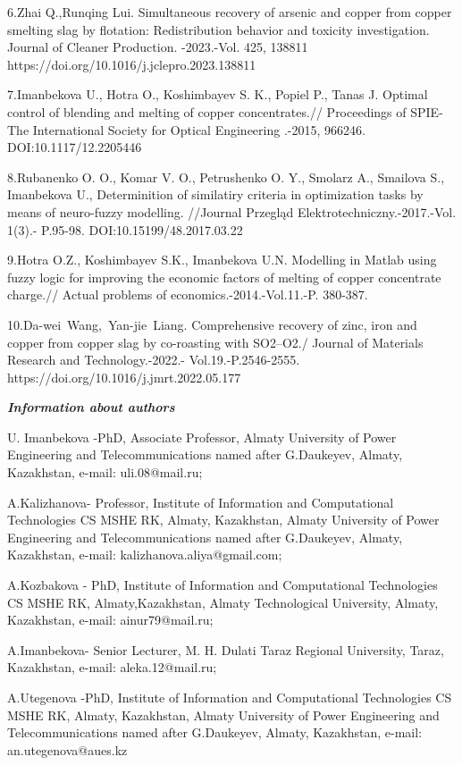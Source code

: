 6.Zhai Q.,Runqing Lui. Simultaneous recovery of arsenic and copper from
copper smelting slag by flotation: Redistribution behavior and toxicity
investigation. Journal of Cleaner Production. -2023.-Vol. 425, 138811
https://doi.org/10.1016/j.jclepro.2023.138811

7.Imanbekova U., Hotra O., Koshimbayev S. K., Popiel P., Tanas J.
Optimal control of blending and melting of copper concentrates.//
Proceedings of SPIE-The International Society for Optical Engineering
.-2015, 966246. DOI:10.1117/12.2205446

8.Rubanenko O. O., Komar V. O., Petrushenko O. Y., Smolarz A., Smailova
S., Imanbekova U., Determinition of similatiry criteria in optimization
tasks by means of neuro-fuzzy modelling. //Journal Przegląd
Elektrotechniczny.-2017.-Vol. 1(3).- P.95-98. DOI:10.15199/48.2017.03.22

9.Hotra O.Z., Koshimbayev S.K., Imanbekova U.N. Modelling in Matlab
using fuzzy logic for improving the economic factors of melting of
copper concentrate charge.// Actual problems of
economics.-2014.-Vol.11.-P. 380-387.

10.Da-wei~Wang,~Yan-jie~Liang. Comprehensive recovery of zinc, iron and
copper from copper slag by co-roasting with SO2--O2./ Journal of
Materials Research and Technology.-2022.- Vol.19.-P.2546-2555.
https://doi.org/10.1016/j.jmrt.2022.05.177

\emph{{\bfseries Information about authors}}

U. Imanbekova -PhD, Associate Professor, Almaty University of Power
Engineering and Telecommunications named after G.Daukeyev, Almaty,
Kazakhstan, e-mail: uli.08@mail.ru;

A.Kalizhanova- Professor, Institute of Information and Computational
Technologies CS MSHE RK, Almaty, Kazakhstan, Almaty University of Power
Engineering and Telecommunications named after G.Daukeyev, Almaty,
Kazakhstan, e-mail: kalizhanova.aliya@gmail.com;

A.Kozbakova - PhD, Institute of Information and Computational
Technologies CS MSHE RK, Almaty,Kazakhstan, Almaty Technological
University, Almaty, Kazakhstan, e-mail: ainur79@mail.ru;

A.Imanbekova- Senior Lecturer, M. H. Dulati Taraz Regional University,
Taraz, Kazakhstan, e-mail: aleka.12@mail.ru;

A.Utegenova -PhD, Institute of Information and Computational
Technologies CS MSHE RK, Almaty, Kazakhstan, Almaty University of Power
Engineering and Telecommunications named after G.Daukeyev, Almaty,
Kazakhstan, e-mail: an.utegenova@aues.kz

